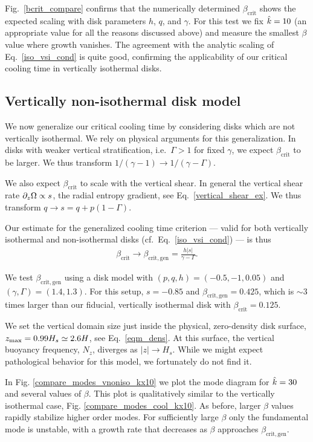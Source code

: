 Fig.\ \ref{bcrit_compare} confirms that the numerically determined
$\beta_\mathrm{crit}$ shows the expected scaling with disk parameters $h$, $q$, and $\gamma$.
For this test we fix $\hat{k} = 10$ (an appropriate value for all the reasons discussed above) and measure
the smallest $\beta$ value where growth vanishes.  The agreement with the analytic scaling of 
Eq.\ \ref{iso_vsi_cond} is quite good, confirming the applicability of our critical cooling time in
vertically isothermal disks.


\subsection{Vertically non-isothermal disk model}\label{nonvertiso}
We now generalize our critical cooling time by considering disks which
are not vertically isothermal.  We rely on physical arguments for this generalization.
In disks with weaker vertical stratification, i.e.\ $\Gamma > 1$ for
fixed $\gamma$, we expect $\beta_\mathrm{crit}$ to be larger.
We thus transform $1/(\gamma -1) \to 1/(\gamma - \Gamma)$.  

We also expect $\beta_\mathrm{crit}$ to scale with the vertical shear.   
In general the vertical shear rate $\partial_z\Omega\propto s$, the radial
entropy gradient, see Eq.\ \ref{vertical_shear_ex}.  We thus 
 transform $q \to s = q +p(1-\Gamma)$.
 
Our estimate for the generalized cooling 
 time criterion --- valid for both vertically isothermal and non-isothermal disks (cf.\ Eq.\ \ref{iso_vsi_cond}) --- is thus
\begin{align}\label{bcrit_noniso}
 \beta_\mathrm{crit}\to\beta_\mathrm{crit, gen} =
 \frac{h|s|}{\gamma - \Gamma}. 
\end{align}

We test $\beta_\mathrm{crit, gen}$ using a disk model with 
$(p,q, h)=(-0.5,-1,0.05)$ and $(\gamma,
\Gamma)=(1.4,1.3)$. For this setup, $s=-0.85$ and
$\beta_\mathrm{crit,gen}=0.425$, which is $\sim 3$ times larger than
our fiducial, vertically isothermal disk with $\beta_\mathrm{crit}=0.125$. 

We set the vertical domain size just inside the
physical, zero-density disk surface, $z_\mathrm{max} = 0.99H_s\simeq 2.6H$, see Eq.\ \ref{eqm_dens}. 
At this surface, the vertical buoyancy frequency, $N_z$,  diverges as $|z|\to H_s$.  While we might expect
pathological behavior for this model, we fortunately do not find it.


In Fig. \ref{compare_modes_vnoniso_kx10} we plot the mode diagram for
$\hat{k}=30$ and several values of $\beta$. This plot is 
qualitatively similar to the vertically isothermal case, Fig. \ref{compare_modes_cool_kx10}. As before, 
larger $\beta$ values rapidly
stabilize higher order modes.  For sufficiently large $\beta$ only the fundamental mode is unstable, with a growth rate
that decreases as $\beta$ approaches 
$\beta_\mathrm{crit,gen}$.

